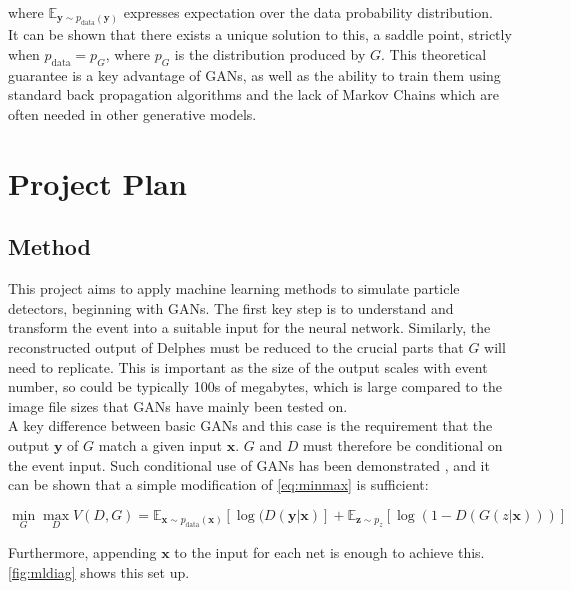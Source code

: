 \documentclass{article}
\begin{document}
where  $\mathbb{E}_{\mathbf{y}\sim p_{\text{data}}(\mathbf{y})}$ expresses expectation over the data probability distribution.  \\

It can be shown that there exists a unique solution to this, a saddle point, strictly when $p_{\text{data}} = p_G$, where $p_G$ is the distribution produced by $G$. This theoretical guarantee is a key advantage of GANs, as well as the ability to train them using standard back propagation algorithms and the lack of Markov Chains which are often needed in other generative models.   



\section{Project Plan}
\label{sec:plan}


\subsection{Method}
This project aims to apply machine learning methods to simulate particle detectors, beginning with GANs. The first key step is to understand and transform the event into a suitable input for the neural network. Similarly, the reconstructed output of Delphes must be reduced to the crucial parts that $G$ will need to replicate. This is important as the size of the output scales with event number, so could be typically 100s of megabytes, which is large compared to the image file sizes that GANs have mainly been tested on.\\

A key difference between basic GANs and this case is the requirement that the output $\mathbf{y}$ of $G$ match a given input $\mathbf{x}$. $G$ and $D$ must therefore be conditional on the event input. Such conditional use of GANs has been demonstrated \cite{Mirza2014}, and it can be shown that a simple modification of \cref{eq:minmax} is sufficient:

\[
 \min_{G}\max_{D}V(D,G) = \mathbb{E}_{\mathbf{x}\sim p_{\text{data}}(\mathbf{x})} [\log(D(\mathbf{y|x})] + \mathbb{E}_{\mathbf{z}\sim p_{z}} [\log(1-D(G(z|\mathbf{x})))] 
\]

Furthermore, appending $\mathbf{x}$ to the input for each net is enough to achieve this. \cref{fig:mldiag} shows this set up.
\end{document}
